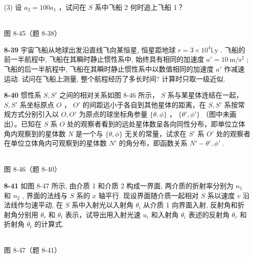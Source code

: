 (3) 设 $a_{2}=100a_{1}$ ，试问在 $S$ 系中飞船 2 何时追上飞船 1？

\begin{center}
\resizebox{0.50\textwidth}{!}{}\\[4pt]
{\small 图 8-45（题 8-38）}
\end{center}

\newpage

\textbf{8-39} 宇宙飞船从地球出发沿直线飞向某恒星, 恒星距地球 $r = 3 \times 10^{4} \mathrm{l}. \mathrm{y}$ . 飞船的前一半航程中, 飞船在其瞬时静止惯性系中, 始终具有相同的加速度 $a' = 10 \mathrm{~m} / \mathrm{s}^{2}$ ; 飞船的后一半航程中, 飞船在其瞬时静止惯性系中以数值相同的加速度 $a'$ 作减速运动. 试问在飞船上测量, 整个航程经历了多长时间? 计算时只取一级近似.

\newpage

\textbf{8-40} 惯性系 $S, S'$ 之间的相对关系如图 8-46 所示， $S$ 系与某星体连结在一起， $S, S'$ 系坐标原点 $O$ ， $O'$ 的间距远小于各自到其他星体的距离，在 $S, S'$ 系按常规方式分别引入以 $O, O'$ 为原点的球坐标角参量 $\{\theta, \phi\}$ ， $\{\theta', \phi'\}$ （图中未画出）。已知在 $S$ 系 $O$ 处的观察者看到的远处星体数呈各向同性分布，即单位立体角内观察到的星体数 $N$ 是一个与 $\{\theta, \phi\}$ 无关的常量，试求在 $S'$ 系 $O'$ 处的观察者在单位立体角内可观察到的星体数 $N'$ 的角分布，即函数关系 $N' - \theta', \phi'$ .

\begin{center}
\resizebox{0.50\textwidth}{!}{}\\[4pt]
{\small 图 8-46（题 8-40）}
\end{center}

\newpage

\textbf{8-41} 如图 8-47 所示, 由介质 1 和介质 2 构成一界面, 两介质的折射率分别为 $n_1$ 和 $n_2$ , 界面的法线与 $S$ 系的 $x$ 轴平行. 现设界面随介质一起相对 $S$ 系以速度 $v$ 沿法线作匀速平动, 在 $S$ 系中入射光以入射角 $\theta_i$ 从介质 1 向界面入射, 反射角和折射角分别用 $\theta_{r}$ 和 $\theta_{t}$ 表示，试导出用入射光速 $u_{i}$ 和入射角 $\theta_{i}$ 表述的反射角 $\theta_{r}$ 和折射角 $\theta_{t}$ 的计算式.

\begin{center}
\resizebox{0.50\textwidth}{!}{}\\[4pt]
{\small 图 8-47（题 8-41）}
\end{center}


